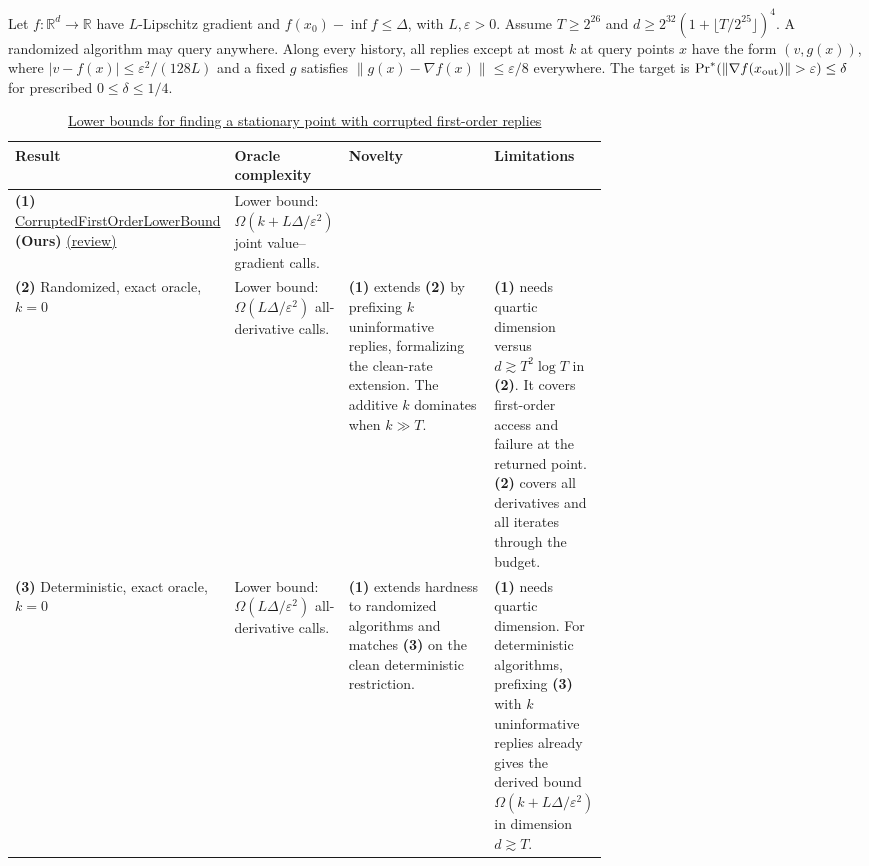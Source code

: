 \begin{table}[tp]
\centering
\caption{\href{https://github.com/k3nfalt/longtails/blob/main/LongTails/Setups/HighDimensionalCorruptedFirstOrderNonconvex.lean}{Lower bounds for finding a stationary point with corrupted first-order replies}}\label{tab:HighDimensionalCorruptedFirstOrderNonconvex}
\parbox{\linewidth}{\footnotesize Let $f:\mathbb R^d\to\mathbb R$ have $L$-Lipschitz gradient and $f(x_0)-\inf f\le\Delta$, with $L,\varepsilon>0$. Assume $T\ge 2^{26}$ and $d\ge 2^{32}(1+\lfloor T/2^{25}\rfloor)^4$. A randomized algorithm may query anywhere. Along every history, all replies except at most $k$ at query points $x$ have the form $(v,g(x))$, where $|v-f(x)|\le\varepsilon^2/(128L)$ and a fixed $g$ satisfies $\|g(x)-\nabla f(x)\|\le\varepsilon/8$ everywhere. The target is $\Pr^*(\|\nabla f(x_{\rm out})\|>\varepsilon)\le\delta$ for prescribed $0\le\delta\le1/4$.}\par\smallskip
\begin{threeparttable}
\footnotesize
\setlength{\tabcolsep}{4pt}\renewcommand{\arraystretch}{1.25}
\begin{tabularx}{\linewidth}{@{}>{\raggedright\arraybackslash}p{0.21\linewidth}>{\raggedright\arraybackslash}p{0.19\linewidth}>{\raggedright\arraybackslash}p{0.29\linewidth}>{\raggedright\arraybackslash}X@{}}
\toprule
\textbf{Result} & \textbf{Oracle complexity} & \textbf{Novelty} & \textbf{Limitations} \\
\midrule
\textbf{(1)} \href{https://github.com/k3nfalt/longtails/blob/main/LongTails/Theorems/CorruptedFirstOrderLowerBound.lean}{Corrupted\allowbreak First\allowbreak Order\allowbreak Lower\allowbreak Bound} \textbf{(Ours)} \href{https://github.com/k3nfalt/longtails/blob/main/scripts/reviews/CorruptedFirstOrderLowerBound.md}{(review)} & Lower bound: $\Omega(k+L\Delta/\varepsilon^2)$ joint value--gradient calls. & & \\
\midrule[1.2pt]
\textbf{(2)} \citep[Thm.~2]{sncCarmon2020v3}\newline Randomized, exact oracle, $k=0$ & Lower bound: $\Omega(L\Delta/\varepsilon^2)$ all-derivative calls. & \textbf{(1)} extends \textbf{(2)} by prefixing $k$ uninformative replies, formalizing the clean-rate extension. The additive $k$ dominates when $k\gg T$. & \textbf{(1)} needs quartic dimension versus $d\gtrsim T^2\log T$ in \textbf{(2)}. It covers first-order access and failure at the returned point. \textbf{(2)} covers all derivatives and all iterates through the budget. \\
\midrule
\textbf{(3)} \citep[Thm.~1]{sncCarmon2020v3}\newline Deterministic, exact oracle, $k=0$ & Lower bound: $\Omega(L\Delta/\varepsilon^2)$ all-derivative calls. & \textbf{(1)} extends hardness to randomized algorithms and matches \textbf{(3)} on the clean deterministic restriction. & \textbf{(1)} needs quartic dimension. For deterministic algorithms, prefixing \textbf{(3)} with $k$ uninformative replies already gives the derived bound $\Omega(k+L\Delta/\varepsilon^2)$ in dimension $d\gtrsim T$. \\

\end{tabularx}
\end{threeparttable}
\end{table}
